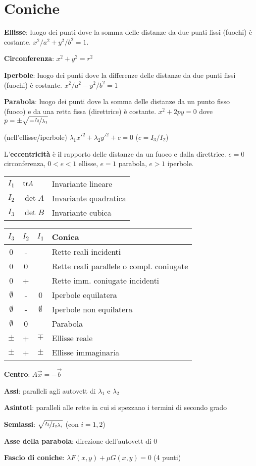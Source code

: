 \section{Coniche}

\textbf{Ellisse}: luogo dei punti dove la somma delle distanze da due punti fissi (fuochi) è costante. $x^2/a^2 + y^2/b^2 = 1$.

\textbf{Circonferenza}: $x^2+y^2=r^2$

\textbf{Iperbole}: luogo dei punti dove la differenze delle distanze da due punti fissi (fuochi) è costante. $x^2/a^2 - y^2/b^2 = 1$

\textbf{Parabola}: luogo dei punti dove la somma delle distanze da un punto fisso (fuoco) e da una retta fissa (direttrice) è costante. $x^2+2py=0$ dove $p=\pm \sqrt{-\nicefrac{I_3}{\lambda_1}}$

(nell'ellisse/iperbole) $\lambda_1x'^2+\lambda_2y'^2+c=0$ ($c=I_3/I_2$)

L'\textbf{eccentricità} è il rapporto delle distanze da un fuoco e dalla direttrice. $e = 0$ circonferenza, $0 < e < 1$ ellisse, $e = 1$ parabola, $e > 1$ iperbole. 

\begin{tabular}{lll}
	$I_1$ & $\mathrm{tr} A$ & Invariante lineare \\
	$I_2$ & $\det A$ & Invariante quadratica \\
	$I_3$ & $\det B$ & Invariante cubica
\end{tabular}

\begin{tabular}{c|c|c|l}
	\boldmath$I_3$ & \boldmath$I_2$ & \boldmath$I_1$ & \textbf{Conica} \\
	\hline
	0     & -     &       & Rette reali incidenti \\
	0     & 0     &       & Rette reali parallele o compl. coniugate \\
	0     & +     &       & Rette imm. coniugate incidenti \\
	\hline
	$\emptyset$ & -     & 0     & Iperbole equilatera \\
	$\emptyset$ & -     & $\emptyset$ & Iperbole non equilatera \\
	$\emptyset$ & 0     &       & Parabola \\
	$\pm$ & +     & $\mp$ & Ellisse reale \\
	$\pm$ & +     & $\pm$ & Ellisse immaginaria \\
	\hline
\end{tabular}

\textbf{Centro}: $A\vec{x} = -\vec{b}$

\textbf{Assi}: paralleli agli autovett di $\lambda_1$ e $\lambda_2$

\textbf{Asintoti}: paralleli alle rette in cui si spezzano i termini di secondo grado

\textbf{Semiassi}: $\sqrt{\nicefrac{I_3}{I_2\lambda_i}}$ (con $i=1,2$)

\textbf{Asse della parabola}: direzione dell'autovett di 0

\textbf{Fascio di coniche}: $\lambda F(x,y) + \mu G(x,y) = 0$ (4 punti)
